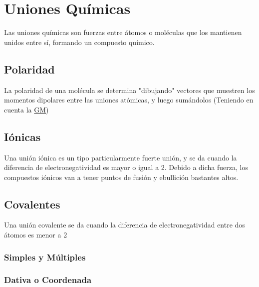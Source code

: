 \documentclass[../Teoría.root.tex]{subfiles}
\begin{document}
\section{Uniones Químicas}
Las uniones químicas son fuerzas entre átomos o moléculas que los mantienen unidos entre sí, formando un compuesto químico.

\subsection{Polaridad}
La polaridad de una molécula se determina "dibujando" vectores que muestren los momentos dipolares entre las uniones atómicas, y luego sumándolos (Teniendo en cuenta la \hyperref[sec:trepev]{GM})

\subsection{Iónicas}
Una unión iónica es un tipo particularmente fuerte unión, y se da cuando la diferencia de electronegatividad es mayor o igual a 2. Debido a dicha fuerza, los compuestos iónicos van a tener puntos de fusión y ebullición bastantes altos.

\subsection{Covalentes}
Una unión covalente se da cuando la diferencia de electronegatividad entre dos átomos es menor a 2

\subsubsection{Simples y Múltiples}

\subsubsection{Dativa o Coordenada}
\end{document}
